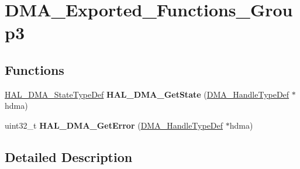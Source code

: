 \hypertarget{group___d_m_a___exported___functions___group3}{}\section{D\+M\+A\+\_\+\+Exported\+\_\+\+Functions\+\_\+\+Group3}
\label{group___d_m_a___exported___functions___group3}
\subsection*{Functions}
\begin{DoxyCompactItemize}
\item 
\mbox{\label{group___d_m_a___exported___functions___group3_gaef09509c41da57dc118c8ffb9533ce3f}} 
\hyperlink{group___d_m_a___exported___types_ga9c012af359987a240826f29073bbe463}{H\+A\+L\+\_\+\+D\+M\+A\+\_\+\+State\+Type\+Def} {\bfseries H\+A\+L\+\_\+\+D\+M\+A\+\_\+\+Get\+State} (\hyperlink{group___d_m_a___exported___types_ga92b907d56a9c29b93d46782a7a04f91e}{D\+M\+A\+\_\+\+Handle\+Type\+Def} $\ast$hdma)
\item 
\mbox{\label{group___d_m_a___exported___functions___group3_gabc0735694a0dd08e352b796d7fa7634f}} 
uint32\+\_\+t {\bfseries H\+A\+L\+\_\+\+D\+M\+A\+\_\+\+Get\+Error} (\hyperlink{group___d_m_a___exported___types_ga92b907d56a9c29b93d46782a7a04f91e}{D\+M\+A\+\_\+\+Handle\+Type\+Def} $\ast$hdma)
\end{DoxyCompactItemize}


\subsection{Detailed Description}
